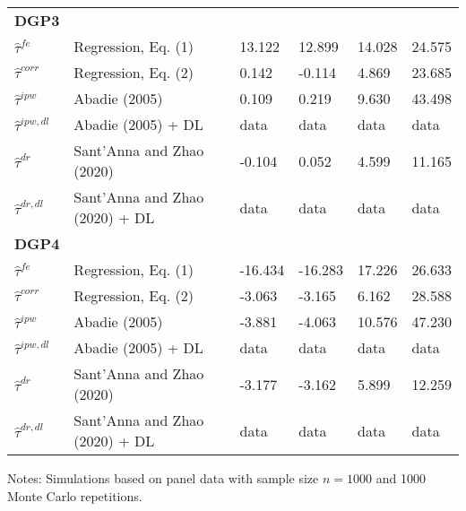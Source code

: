 \begin{table}[htbp]
{\begin{threeparttable}
\begin{tabular}{llllll}
\addlinespace
\large \textbf{DGP3}            &                                   &            &             &      &           \\
\addlinespace
$\hat{\tau}^{fe}$ & Regression, Eq. (1)               & 13.122       & 12.899       & 14.028 & 24.575     \\
$\hat{\tau}^{corr}$ & Regression, Eq. (2)             & 0.142       & -0.114       & 4.869 & 23.685    \\
$\hat{\tau}^{ipw}$ & Abadie (2005)                    & 0.109     & 0.219      & 9.630 & 43.498     \\
$\hat{\tau}^{ipw,dl}$ & Abadie (2005) + DL            & data       & data        & data & data      \\
$\hat{\tau}^{dr}$ & Sant'Anna and Zhao (2020)         & -0.104       & 0.052        & 4.599 & 11.165      \\
$\hat{\tau}^{dr,dl}$ & Sant'Anna and Zhao (2020) + DL & data       & data        & data & data      \\  \midrule


\addlinespace
\large \textbf{DGP4}            &                                   &            &             &      &           \\
\addlinespace
$\hat{\tau}^{fe}$ & Regression, Eq. (1)               & -16.434       & -16.283        & 17.226 & 26.633     \\
$\hat{\tau}^{corr}$ & Regression, Eq. (2)             & -3.063       & -3.165       & 6.162 & 28.588     \\
$\hat{\tau}^{ipw}$ & Abadie (2005)                    & -3.881       & -4.063        & 10.576 & 47.230      \\
$\hat{\tau}^{ipw,dl}$ & Abadie (2005) + DL            & data       & data        & data & data      \\
$\hat{\tau}^{dr}$ & Sant'Anna and Zhao (2020)         &-3.177      &-3.162       & 5.899 & 12.259      \\
$\hat{\tau}^{dr,dl}$ & Sant'Anna and Zhao (2020) + DL & data       & data        & data & data      \\


\bottomrule
\end{tabular}
\vspace{1em}
\begin{tablenotes}
\item Notes: Simulations based on panel data with sample size $n = 1000$ and 1000 Monte Carlo repetitions.
\end{tablenotes}
\end{threeparttable}}
\end{table}

